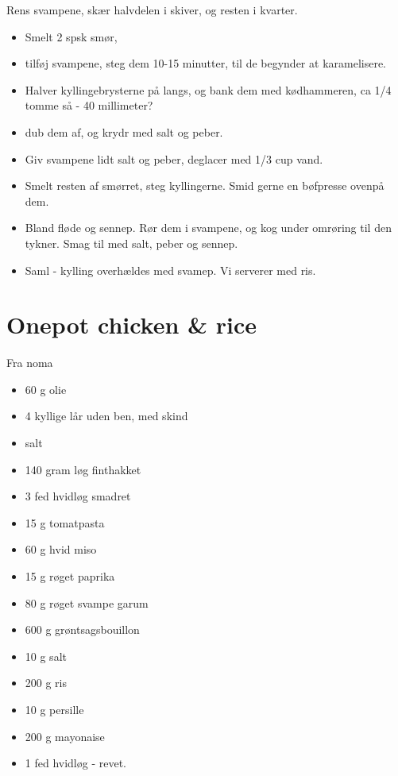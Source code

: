 \documentclass[
]{book}
\providecommand{\tightlist}{%
  \setlength{\itemsep}{0pt}\setlength{\parskip}{0pt}}
\begin{document}
Rens svampene, skær halvdelen i skiver, og resten i kvarter.

\begin{itemize}
\tightlist
\item
  Smelt 2 spsk smør,
\item
  tilføj svampene, steg dem 10-15 minutter, til
  de begynder at karamelisere.
\item
  Halver kyllingebrysterne på langs,
  og bank dem med kødhammeren, ca 1/4 tomme så - 40 millimeter?
\item
  dub dem af, og krydr med salt og peber.
\item
  Giv svampene lidt salt og peber, deglacer med 1/3 cup vand.
\item
  Smelt resten af smørret, steg kyllingerne. Smid gerne en
  bøfpresse ovenpå dem.
\item
  Bland fløde og sennep. Rør dem i svampene, og kog under omrøring
  til den tykner. Smag til med salt, peber og sennep.
\item
  Saml - kylling overhældes med svamep. Vi serverer med ris.
\end{itemize}

\section{Onepot chicken \& rice}\label{onepot-chicken-rice}

Fra noma

\begin{itemize}
\item
  60 g olie
\item
  4 kyllige lår uden ben, med skind
\item
  salt
\item
  140 gram løg finthakket
\item
  3 fed hvidløg smadret
\item
  15 g tomatpasta
\item
  60 g hvid miso
\item
  15 g røget paprika
\item
  80 g røget svampe garum
\item
  600 g grøntsagsbouillon
\item
  10 g salt
\item
  200 g ris
\item
  10 g persille
\item
  200 g mayonaise
\item
  1 fed hvidløg - revet.
\end{itemize}
\end{document}
